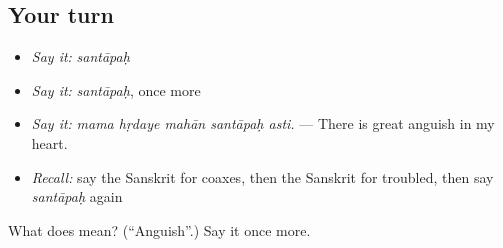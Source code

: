 \subsection*{Your turn}
\begin{itemize}
\raggedright
  \item \emph{Say it:} \emph{santāpaḥ}
  \item \emph{Say it:} \emph{santāpaḥ}, once more
  \item \emph{Say it:} \emph{mama hṛdaye mahān santāpaḥ asti.} — There is great anguish in my heart.
  \item \emph{Recall:} say the Sanskrit for coaxes, then the Sanskrit for troubled, then say \emph{santāpaḥ} again
\end{itemize}

\begin{tcolorbox}[breakable,colback=teal!4,colframe=teal!35!black,title={Before you move on}]
What does  mean? (\textquotedblleft{}Anguish\textquotedblright{}.) Say it once more.
\end{tcolorbox}
